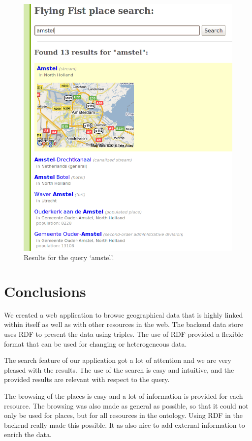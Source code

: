 \documentclass[a4paper,12pt]{article}
\begin{document}
\begin{figure}[h]
  \includegraphics[width=\linewidth]{img/search.png}
  \caption{Results for the query `amstel'.}
  \label{search}
\end{figure}

\clearpage
\section{Conclusions}

We created a web application to browse geographical data that is
highly linked within itself as well as with other resources in the
web. The backend data store uses RDF to present the data using
triples. The use of RDF provided a flexible format that can be used
for changing or heterogeneous data.

The search feature of our application got a lot of attention and we
are very pleased with the results. The use of the search is easy and
intuitive, and the provided results are relevant with respect to the
query.

The browsing of the places is easy and a lot of information is
provided for each resource. The browsing was also made as general as
possible, so that it could not only be used for places, but for all
resources in the ontology. Using RDF in the backend really made this
possible. It as also nice to add external information to enrich the
data.
\end{document}
